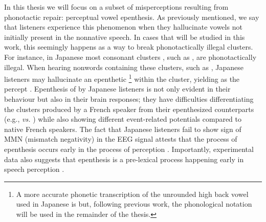 In this thesis we will focus on a subset of misperceptions resulting from phonotactic repair: perceptual vowel epenthesis. As previously mentioned, we say that listeners experience this phenomenon when they hallucinate vowels not initially present in the nonnative speech. In cases that will be studied in this work, this seemingly happens as a way to break phonotactically illegal clusters. For instance, in Japanese most consonant clusters%
, such as , are phonotactically illegal. When hearing nonwords containing these clusters, such as , Japanese listeners may hallucinate an epenthetic \footnote{A more accurate phonetic transcription of the unrounded high back vowel used in Japanese is \textipa{[W]} but, following previous work, the phonological notation  will be used in the remainder of the thesis.} within the cluster, yielding  as the percept \cite{dupoux1999}. Epenthesis of  by Japanese listeners is not only evident in their behaviour but also in their brain responses; they have difficulties differentiating the clusters produced by a French speaker from their epenthesized counterparts (e.g.,  \textit{vs.} ) while also showing different event-related potentials compared to native French speakers. The fact that Japanese listeners fail to show sign of MMN (mismatch negativity) in the EEG signal attests that the process of epenthesis occurs early in the process of perception \cite{dehaene2000}. Importantly, experimental data also suggests that epenthesis is a pre-lexical process happening early in speech perception \cite{dupoux2001}.

